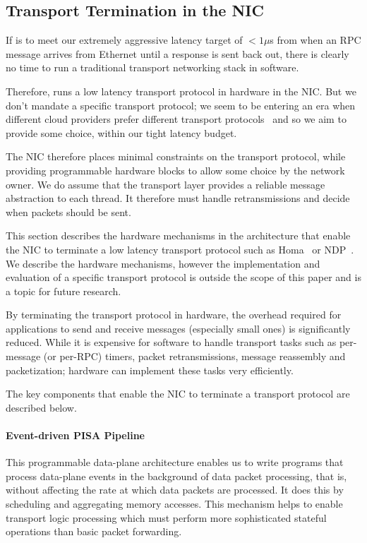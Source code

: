 \subsection{Transport Termination in the NIC}
\label{ssec:nic-transport}
If \name{} is to meet our extremely aggressive latency target of $<1\mu$s from when an RPC message arrives from Ethernet until a response is sent back out, there is clearly no time to run a traditional transport networking stack in software. 

Therefore, \name{} runs a low latency transport protocol in hardware in the NIC. But we don't mandate a specific transport protocol; we seem to be entering an era when different cloud providers prefer different transport protocols~\cite{timely,hpcc,dcqcn} and so we aim to provide some choice, within our tight latency budget.

The NIC therefore places minimal constraints on the transport protocol, while providing programmable hardware blocks to allow some choice by the network owner. We do assume that the transport layer provides a reliable message abstraction to each thread. It therefore must handle retransmissions and decide when packets should be sent. 


This section describes the hardware mechanisms in the \name{} architecture that enable the NIC to terminate a low latency transport protocol such as Homa~\cite{homa} or NDP~\cite{ndp}.
We describe the hardware mechanisms, however the implementation and evaluation of a specific transport protocol is outside the scope of this paper and is a topic for future research.

By terminating the transport protocol in hardware, the overhead required for applications to send and receive messages (especially small ones) is significantly reduced.
While it is expensive for software to handle transport tasks such as per-message (or per-RPC) timers, packet retransmissions, message reassembly and packetization; hardware can implement these tasks very efficiently.

The key components that enable the NIC to terminate a transport protocol are described below.

\paragraph{Event-driven PISA Pipeline~\cite{event-driven-pisa}}
This programmable data-plane architecture enables us to write programs that process data-plane events in the background of data packet processing, that is, without affecting the rate at which data packets are processed.
It does this by scheduling and aggregating memory accesses.
This mechanism helps to enable transport logic processing which must perform more sophisticated stateful operations than basic packet forwarding.

